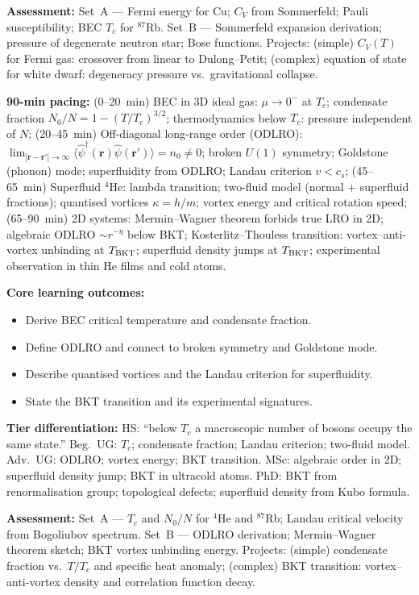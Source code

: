 \documentclass[11pt,a4paper]{article}
\begin{document}
\begin{tcolorbox}[modulebox, title={Module~II.7 --- Lecture L03: Quantum Ideal Gases}]
\medskip\textbf{Assessment:}
Set~A --- Fermi energy for Cu; $C_V$ from Sommerfeld; Pauli susceptibility; BEC $T_c$ for $^{87}$Rb.
Set~B --- Sommerfeld expansion derivation; pressure of degenerate neutron star; Bose functions.
Projects: (simple) $C_V(T)$ for Fermi gas: crossover from linear to Dulong--Petit;
(complex) equation of state for white dwarf: degeneracy pressure vs.\ gravitational collapse.
\end{tcolorbox}

\medskip

\begin{tcolorbox}[modulebox, title={Module~II.7 --- Lecture L04: Bose--Einstein Condensation and Superfluidity}]
\textbf{90-min pacing:} (0--20~min) BEC in 3D ideal gas: $\mu\to 0^-$ at $T_c$; condensate fraction $N_0/N=1-(T/T_c)^{3/2}$; thermodynamics below $T_c$: pressure independent of $N$; (20--45~min) Off-diagonal long-range order (ODLRO): $\lim_{|\mathbf{r}-\mathbf{r}'|\to\infty}\langle\hat\psi^\dagger(\mathbf{r})\hat\psi(\mathbf{r}')\rangle=n_0\neq 0$; broken $U(1)$ symmetry; Goldstone (phonon) mode; superfluidity from ODLRO; Landau criterion $v<c_s$; (45--65~min) Superfluid $^4$He: lambda transition; two-fluid model (normal + superfluid fractions); quantised vortices $\kappa=h/m$; vortex energy and critical rotation speed; (65--90~min) 2D systems: Mermin--Wagner theorem forbids true LRO in 2D; algebraic ODLRO $\sim r^{-\eta}$ below BKT; Kosterlitz--Thouless transition: vortex--anti-vortex unbinding at $T_{\rm BKT}$; superfluid density jumps at $T_{\rm BKT}$; experimental observation in thin He films and cold atoms.

\medskip\textbf{Core learning outcomes:}
\begin{itemize}[leftmargin=1.4em,topsep=2pt,itemsep=1pt]
  \item Derive BEC critical temperature and condensate fraction.
  \item Define ODLRO and connect to broken symmetry and Goldstone mode.
  \item Describe quantised vortices and the Landau criterion for superfluidity.
  \item State the BKT transition and its experimental signatures.
\end{itemize}

\medskip\textbf{Tier differentiation:}
HS: ``below $T_c$ a macroscopic number of bosons occupy the same state.''
Beg.\ UG: $T_c$; condensate fraction; Landau criterion; two-fluid model.
Adv.\ UG: ODLRO; vortex energy; BKT transition.
MSc: algebraic order in 2D; superfluid density jump; BKT in ultracold atoms.
PhD: BKT from renormalisation group; topological defects; superfluid density from Kubo formula.

\medskip\textbf{Assessment:}
Set~A --- $T_c$ and $N_0/N$ for $^4$He and $^{87}$Rb; Landau critical velocity from Bogoliubov spectrum.
Set~B --- ODLRO derivation; Mermin--Wagner theorem sketch; BKT vortex unbinding energy.
Projects: (simple) condensate fraction vs.\ $T/T_c$ and specific heat anomaly;
(complex) BKT transition: vortex--anti-vortex density and correlation function decay.
\end{tcolorbox}
\end{document}
